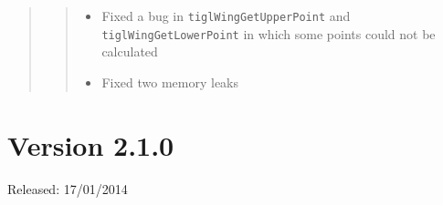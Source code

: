\documentclass[]{scrartcl}
\begin{document}
\begin{quote}
\begin{itemize}
  \begin{quote}
  \begin{itemize}
  \itemsep1pt\parskip0pt
  \item
    Fixed a bug in \texttt{tiglWingGetUpperPoint} and
    \texttt{tiglWingGetLowerPoint} in which some points could not be
    calculated
  \item
    Fixed two memory leaks
  \end{itemize}
  \end{quote}
\end{itemize}
\end{quote}

\section{Version 2.1.0}\label{version-2.1.0}

Released: 17/01/2014
\end{document}

